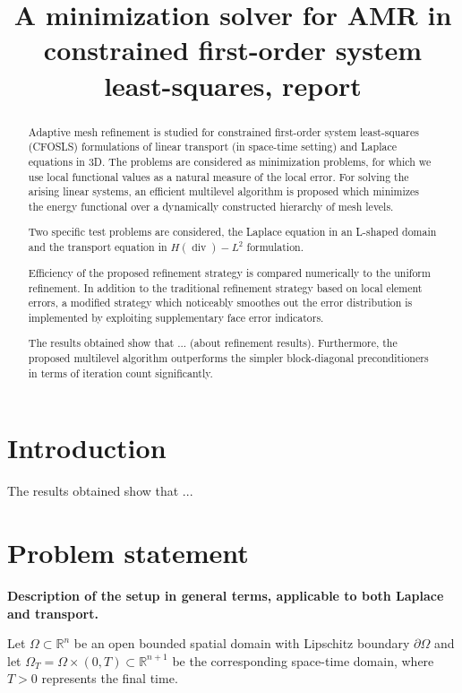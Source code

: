 \documentclass[a4paper,12pt]{amsart}
\title[A minimization solver for AMR in CFOSLS, report] 
{A minimization solver for AMR in constrained first-order system least-squares, report}
\numberwithin{equation}{section}
\renewcommand{\div}{\operatorname{div}}
\begin{document}
 
\begin{abstract}
Adaptive mesh refinement is studied for constrained first-order system least-squares (CFOSLS) formulations of linear transport (in space-time setting) and Laplace equations in 3D. The problems are considered as minimization problems, for which we use local functional values as a natural measure of the local error. For solving the arising linear systems, an efficient multilevel algorithm is proposed which minimizes the energy functional over a dynamically constructed hierarchy of mesh levels.

Two specific test problems are considered, the Laplace equation in an L-shaped domain and the transport equation in $H(\div)-L^2$ formulation.

Efficiency of the proposed refinement strategy is compared numerically to the uniform refinement. In addition to the traditional refinement strategy based on local element errors, a modified strategy which noticeably smoothes out the error distribution is implemented by exploiting supplementary face error indicators.

The results obtained show that ... (about refinement results). Furthermore, the proposed multilevel algorithm outperforms the simpler block-diagonal preconditioners in terms of iteration count significantly.
\end{abstract}
\maketitle

\section{Introduction}

The results obtained show that ...

\section{Problem statement}

\textbf{Description of the setup in general terms, applicable to both Laplace and transport.}

\bigskip

Let $\Omega\subset \mathbb{R}^n$ be an open bounded spatial domain with Lipschitz boundary $\partial \Omega$ and let 
$\Omega_{T} = \Omega\times (0,T)\subset \mathbb{R}^{n+1}$ be the corresponding space-time domain,  where $T>0$ represents the final time.  
\end{document}
